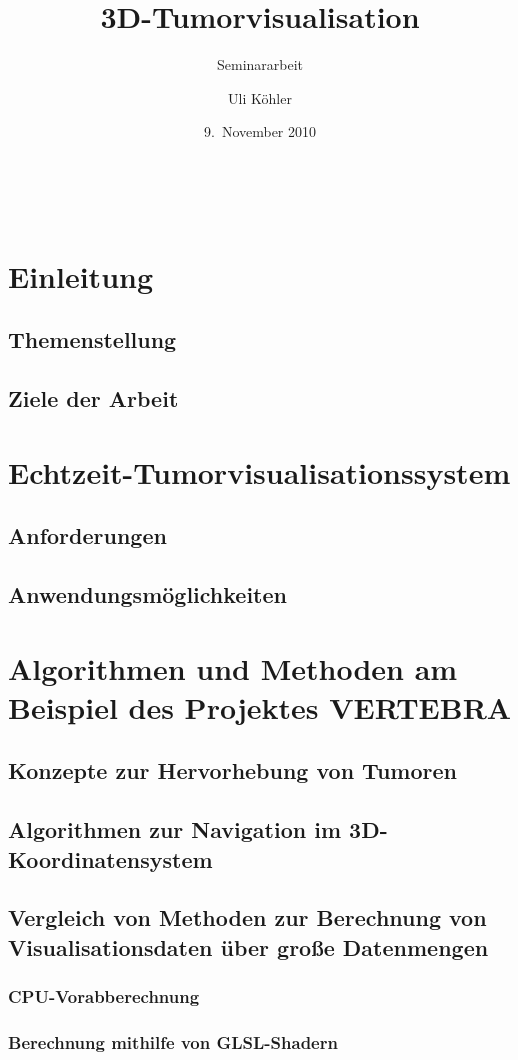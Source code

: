 \documentclass[14pt]{scrartcl}
\title{3D-Tumorvisualisation}
\subtitle{Seminararbeit}
\author{Uli Köhler}
\institute[EMG]{Ernst-Mach-Gymnasium Haar}
\date{9.~November 2010}
\begin{document}
\
\section{Einleitung}
\subsection{Themenstellung}
\subsection{Ziele der Arbeit}
\section{Echtzeit-Tumorvisualisationssystem}
\subsection{Anforderungen}
\subsection{Anwendungsmöglichkeiten}
\section{Algorithmen und Methoden am Beispiel des Projektes VERTEBRA}
\subsection{Konzepte zur Hervorhebung von Tumoren}
\subsection{Algorithmen zur Navigation im 3D-Koordinatensystem}
\subsection{Vergleich von Methoden zur Berechnung von Visualisationsdaten über große Datenmengen}
\subsubsection{CPU-Vorabberechnung}
\subsubsection{Berechnung mithilfe von GLSL-Shadern}
\subsubsection{}
\end{document}
